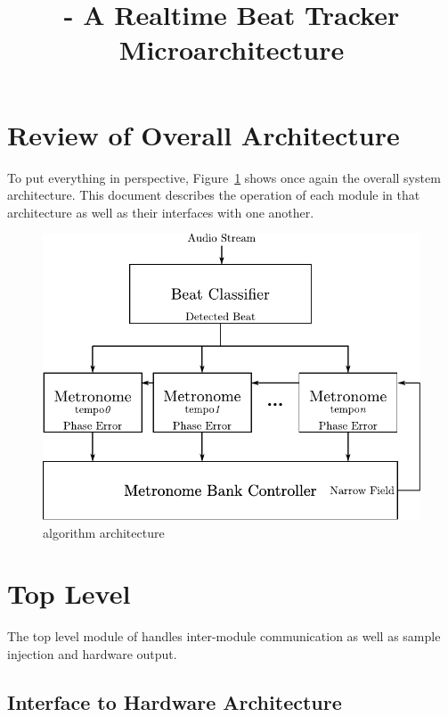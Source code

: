 \documentclass[letterpaper]{article}
\title{\projname{} - A Realtime Beat Tracker \\ Microarchitecture}
\begin{document}
\maketitle

\section{Review of Overall Architecture}

    To put everything in perspective, Figure~\ref{fig:architecture} shows once
    again the overall system architecture.  This document describes the
    operation of each module in that architecture as well as their interfaces
    with one another.

    \begin{figure}
        \centering
        \includegraphics[scale=0.5]{fig/architecture.pdf}
        \caption{\projname algorithm architecture}
        \label{fig:architecture}
    \end{figure}


\section{Top Level}

    The top level module of \projname{} handles inter-module communication as
    well as sample injection and hardware output.

    \subsection{Interface to Hardware Architecture}
\end{document}
